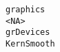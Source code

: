 \documentclass[
  letterpaper,
  DIV=11,
  numbers=noendperiod]{scrreprt}
\begin{document}
\begin{verbatim}
graphics                                                                                                                                                                                                                                                                                                                                                                                                                                                                                                                                                                                                                                                                                                                                                                                                                                                                                                                                                                                                                                                                                                                                                                                                                                                                                                 <NA>
grDevices                                                                                                                                                                                                                                                                                                                                                                                                                                                                                                                                                                                                                                                                                                                                                                                                                                                                                                                                                                                                                                                                                                                                                                                                                                                                                          KernSmooth

\end{verbatim}
\end{document}
